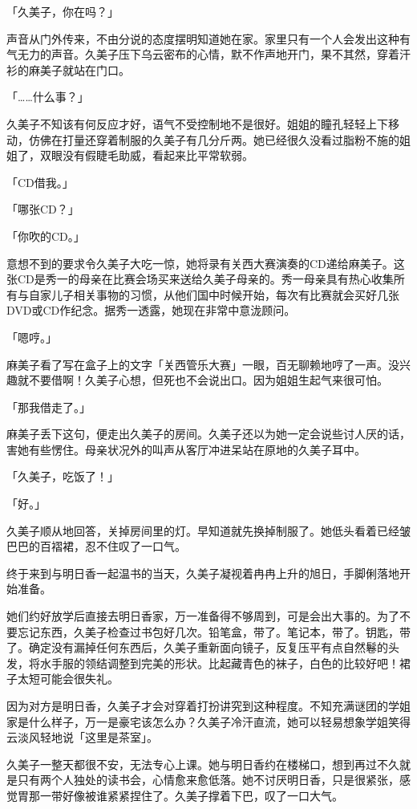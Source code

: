 \documentclass[UTF8]{ctexart}
\begin{document}
    「久美子，你在吗？」 

    声音从门外传来，不由分说的态度摆明知道她在家。家里只有一个人会发出这种有气无力的声音。久美子压下乌云密布的心情，默不作声地开门，果不其然，穿着汗衫的麻美子就站在门口。 

    「……什么事？」 

    久美子不知该有何反应才好，语气不受控制地不是很好。姐姐的瞳孔轻轻上下移动，仿佛在打量还穿着制服的久美子有几分斤两。她已经很久没看过脂粉不施的姐姐了，双眼没有假睫毛助威，看起来比平常软弱。 

    「CD借我。」 

    「哪张CD？」 

    「你吹的CD。」 

    意想不到的要求令久美子大吃一惊，她将录有关西大赛演奏的CD递给麻美子。这张CD是秀一的母亲在比赛会场买来送给久美子母亲的。秀一母亲具有热心收集所有与自家儿子相关事物的习惯，从他们国中时候开始，每次有比赛就会买好几张DVD或CD作纪念。据秀一透露，她现在非常中意泷顾问。 

    「嗯哼。」 

    麻美子看了写在盒子上的文字「关西管乐大赛」一眼，百无聊赖地哼了一声。没兴趣就不要借啊！久美子心想，但死也不会说出口。因为姐姐生起气来很可怕。 

    「那我借走了。」 

    麻美子丢下这句，便走出久美子的房间。久美子还以为她一定会说些讨人厌的话，害她有些愣住。母亲状况外的叫声从客厅冲进呆站在原地的久美子耳中。 

    「久美子，吃饭了！」 

    「好。」 

    久美子顺从地回答，关掉房间里的灯。早知道就先换掉制服了。她低头看着已经皱巴巴的百褶裙，忍不住叹了一口气。 

    终于来到与明日香一起温书的当天，久美子凝视着冉冉上升的旭日，手脚俐落地开始准备。 

    她们约好放学后直接去明日香家，万一准备得不够周到，可是会出大事的。为了不要忘记东西，久美子检查过书包好几次。铅笔盒，带了。笔记本，带了。钥匙，带了。确定没有漏掉任何东西后，久美子重新面向镜子，反复压平有点自然鬈的头发，将水手服的领结调整到完美的形状。比起藏青色的袜子，白色的比较好吧！裙子太短可能会很失礼。 

    因为对方是明日香，久美子才会对穿着打扮讲究到这种程度。不知充满谜团的学姐家是什么样子，万一是豪宅该怎么办？久美子冷汗直流，她可以轻易想象学姐笑得云淡风轻地说「这里是茶室」。 

    久美子一整天都很不安，无法专心上课。她与明日香约在楼梯口，想到再过不久就是只有两个人独处的读书会，心情愈来愈低落。她不讨厌明日香，只是很紧张，感觉胃那一带好像被谁紧紧捏住了。久美子撑着下巴，叹了一口大气。 
\end{document}
